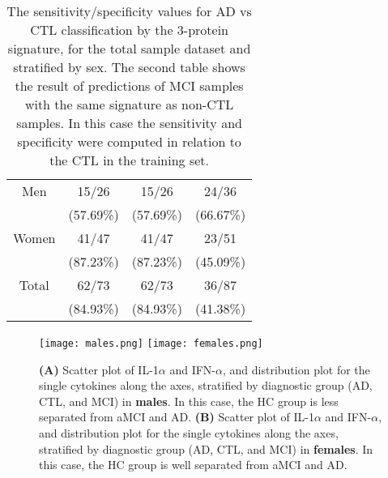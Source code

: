 \documentclass{standalone}
\begin{document}
\begin{table}[!htb]
\begin{minipage}{.5\linewidth}
\begin{tabular}{cccc}
          \hline
              Men     &    15/26            &   15/26                &   24/36               \\
                       &         (57.69\%)  &         (57.69\%)      &         (66.67\%)     \\
              Women   &    41/47            &   41/47                &   23/51               \\
                      &          (87.23\%)  &         (87.23\%)      &         (45.09\%)     \\
              Total   &    62/73            &   62/73                &   36/87               \\
                      &          (84.93\%)  &         (84.93\%)      &         (41.38\%)     \\
          \hline
      \end{tabular}
  \end{minipage}
  \caption{The sensitivity/specificity values for AD vs CTL classification by the 3-protein signature, for the total sample dataset and stratified by sex.
    The second table shows the result of predictions of MCI samples with the same signature as non-CTL samples.
    In this case the sensitivity and specificity were computed in relation to the CTL in the training set.
  }
  \label{tab:cytokine}
\end{table}


\begin{figure}[htbp]
\centering
\texttt{[image: males.png]}
\qquad\qquad
\centering
\texttt{[image: females.png]}
\caption{\textbf{(A)} Scatter plot of IL-1$\alpha$ and IFN-$\alpha$, and distribution plot for the single cytokines along the axes, stratified by diagnostic group (AD, CTL, and MCI) in \textbf{males}.
In this case, the HC group is less separated from aMCI and AD.
\textbf{(B)} Scatter plot of IL-1$\alpha$ and IFN-$\alpha$, and distribution plot for the single cytokines along the axes, stratified by diagnostic group (AD, CTL, and MCI) in \textbf{females}.
In this case, the HC group is well separated from aMCI and AD.
}
\label{fig:cytokine_sex}
\end{figure}
\end{document}
